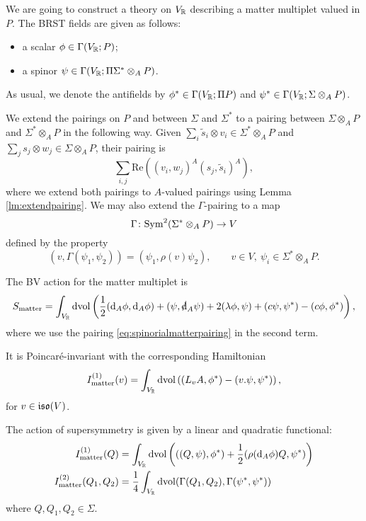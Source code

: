 \documentclass[10pt, oneside]{article}
\newcommand{\matter}{\mathrm{matter}}
\renewcommand{\Re}{\mathrm{Re}}
\begin{document}
We are going to construct a theory on $V_\mathbb R$ describing a matter multiplet valued in $P$. The BRST fields are given as follows:
\begin{itemize}
\item a scalar $\phi\in\Gamma(V_\mathbb R; P)$;
\item a spinor $\psi\in\Gamma(V_\mathbb R; \Pi \Sigma^*\otimes_A P)$.
\end{itemize}
As usual, we denote the antifields by $\phi^*\in\Gamma(V_\mathbb R; \Pi P)$ and $\psi^*\in\Gamma(V_\mathbb R; \Sigma\otimes_A P)$.

We extend the pairings on $P$ and between $\Sigma$ and $\Sigma^*$ to a pairing between $\Sigma\otimes_A P$ and $\Sigma^*\otimes_A P$ in the following way. Given $\sum_i \tilde{s}_i\otimes v_i\in \Sigma^*\otimes_A P$ and $\sum_j s_j\otimes w_j\in\Sigma\otimes_A P$, their pairing is
\begin{equation}
\sum_{i, j} \Re((v_i, w_j)^A (s_j, \tilde{s}_i)^A),
\label{eq:spinorialmatterpairing}
\end{equation}
where we extend both pairings to $A$-valued pairings using Lemma \ref{lm:extendpairing}. We may also extend the $\Gamma$-pairing to a map
\[\Gamma\colon {\rm Sym}^2(\Sigma^*\otimes_A P)\rightarrow V\]
defined by the property
\[(v, \Gamma(\psi_1, \psi_2)) = (\psi_1, \rho(v) \psi_2),\qquad v\in V,\ \psi_i\in \Sigma^*\otimes_A P.\]

The BV action for the matter multiplet is
\[
S_{\matter} = \int_{V_\RR} \dvol \left(\frac{1}{2}  (\d_A \phi, \d_A \phi) + (\psi , \sd \d_A \psi) + 2 (\lambda\phi, \psi) + (c\psi, \psi^*) - (c\phi, \phi^*)\right),
\]
where we use the pairing \eqref{eq:spinorialmatterpairing} in the second term.

It is Poincar\'{e}-invariant with the corresponding Hamiltonian
\begin{equation}
I_{\matter}^{(1)}(v) = \int_{V_\RR}\dvol\left( (L_{v}A, \phi^*) - (v.\psi, \psi^*)\right),
\label{eq:matterPoincareaction}
\end{equation}
for $v\in\mathfrak{iso}(V)$.

The action of supersymmetry is given by a linear and quadratic functional:
\begin{align}
I_{\matter}^{(1)} (Q) & = \int_{V_\RR}\dvol\left( ((Q, \psi), \phi^*) + \frac{1}{2}(\rho(\d_A \phi) Q, \psi^*)\right) \label{eq:matterI1} \\
I_{\matter}^{(2)} (Q_1 , Q_2) & = \frac{1}{4}\int_{V_\RR} \dvol(\Gamma(Q_1, Q_2) , \Gamma(\psi^*, \psi^*)) \label{eq:matterI2}
\end{align}
where $Q, Q_1,Q_2 \in \Sigma$.
\end{document}
